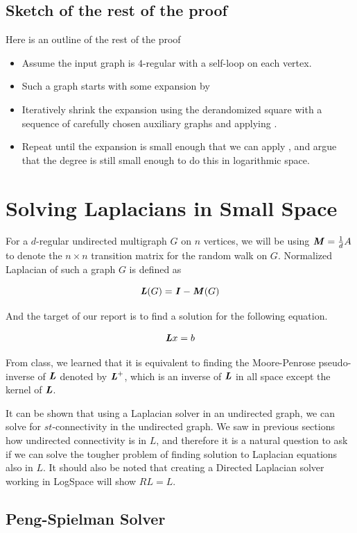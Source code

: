 \documentclass{article}
\begin{document}
\subsection{Sketch of the rest of the proof}
Here is an outline of the rest of the proof
\begin{itemize}
    \item Assume the input graph is $4$-regular with a self-loop on each vertex.
    \item Such a graph starts with some expansion by 
    \item Iteratively shrink the expansion using the derandomized square with a sequence of carefully chosen auxiliary graphs and applying .
    \item Repeat until the expansion is small enough that we can apply , and argue that the degree is still small enough to do this in logarithmic space.
\end{itemize}


\section{Solving Laplacians in Small Space}

For a $d$-regular undirected multigraph $G$ on $n$ vertices, we will be using $\boldsymbol{\mathit{M}}=\frac{1}{d}A$ to denote the $n \times n$ transition matrix for the random walk on $G$. Normalized Laplacian of such a graph $G$ is defined as

$$\boldsymbol{\mathit{L}}(G)=\boldsymbol{\mathit{I}}-\boldsymbol{\mathit{M}}(G)$$ 

And the target of our report is to find a solution for the following equation.

$$\boldsymbol{\mathit{L}} x=b$$

From class, we learned that it is equivalent to finding the Moore-Penrose pseudo-inverse of $\boldsymbol{\mathit{L}}$ denoted by $\boldsymbol{\mathit{L}}^{+}$, which is an inverse of $\boldsymbol{\mathit{L}}$ in all space except the kernel of $\boldsymbol{\mathit{L}}$.

It can be shown that using a Laplacian solver in an undirected graph, we can solve for $st$-connectivity in the undirected graph. We saw in previous sections how undirected connectivity is in $L$, and therefore it is a natural question to ask if we can solve the tougher problem of finding solution to Laplacian equations also in $L$. It should also be noted that creating a Directed Laplacian solver working in LogSpace will show $RL=L$.

\subsection{Peng-Spielman Solver}
\end{document}
